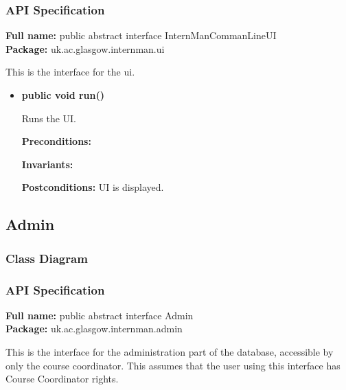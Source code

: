 \documentclass[11pt]{article}
\begin{document}
\subsubsection{API Specification}

\textbf{Full name:} public abstract interface InternManCommanLineUI\\

\textbf{Package:} uk.ac.glasgow.internman.ui

This is the interface for the ui.

\begin{itemize}

\item{\textbf{public void run()}

Runs the UI.

\textbf{Preconditions:} 

\textbf{Invariants:}

\textbf{Postconditions:} UI is displayed.}

\end{itemize}

\subsection{Admin}

\subsubsection{Class Diagram}

\subsubsection{API Specification}

\textbf{Full name:} public abstract interface Admin\\

\textbf{Package:} uk.ac.glasgow.internman.admin

This is the interface for the administration part of the database, accessible by
only the course coordinator.
This assumes that the user using this interface has Course Coordinator
rights.
\end{document}
